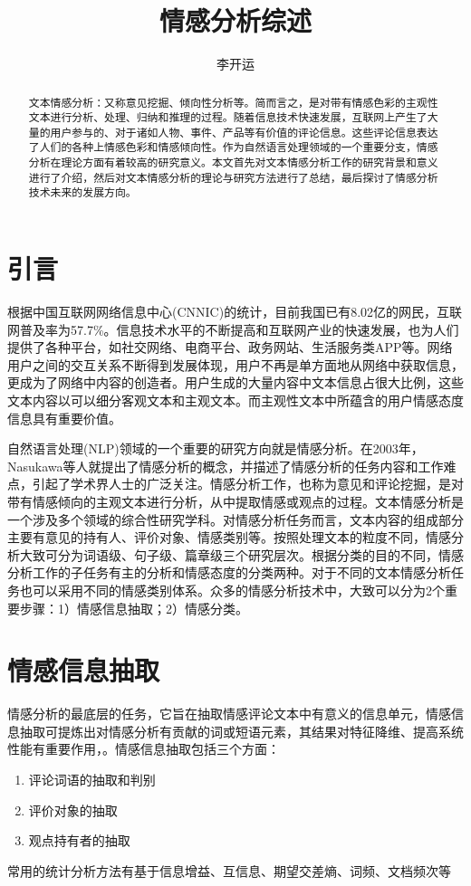 \documentclass{clv3}
\begin{document}
\title{情感分析综述} %

\author{李开运} %


\maketitle

\begin{abstract} %
文本情感分析：又称意见挖掘、倾向性分析等。简而言之，是对带有情感色彩的主观性文本进行分析、处理、归纳和推理的过程。随着信息技术快速发展，互联网上产生了大量的用户参与的、对于诸如人物、事件、产品等有价值的评论信息。这些评论信息表达了人们的各种上情感色彩和情感倾向性。作为自然语言处理领域的一个重要分支，情感分析在理论方面有着较高的研究意义。本文首先对文本情感分析工作的研究背景和意义进行了介绍，然后对文本情感分析的理论与研究方法进行了总结，最后探讨了情感分析技术未来的发展方向。
\end{abstract}

\section{引言} 
根据中国互联网网络信息中心(CNNIC)的统计，目前我国已有8.02亿的网民，互联网普及率为57.7\%。信息技术水平的不断提高和互联网产业的快速发展，也为人们提供了各种平台，如社交网络、电商平台、政务网站、生活服务类APP等。网络用户之间的交互关系不断得到发展体现，用户不再是单方面地从网络中获取信息，更成为了网络中内容的创造者。用户生成的大量内容中文本信息占很大比例，这些文本内容以可以细分客观文本和主观文本。而主观性文本中所蕴含的用户情感态度信息具有重要价值。

自然语言处理(NLP)领域的一个重要的研究方向就是情感分析。在2003年，Nasukawa\cite{sentiment}等人就提出了情感分析的概念，并描述了情感分析的任务内容和工作难点，引起了学术界人士的广泛关注。情感分析工作，也称为意见和评论挖掘，是对带有情感倾向的主观文本进行分析，从中提取情感或观点的过程。文本情感分析是一个涉及多个领域的综合性研究学科。对情感分析任务而言，文本内容的组成部分主要有意见的持有人、评价对象、情感类别等。按照处理文本的粒度不同，情感分析大致可分为词语级、句子级、篇章级三个研究层次。根据分类的目的不同，情感分析工作的子任务有主的分析和情感态度的分类两种。对于不同的文本情感分析任务也可以采用不同的情感类别体系。众多的情感分析技术中，大致可以分为2个重要步骤：1）情感信息抽取；2）情感分类。
\section{情感信息抽取}
情感分析的最底层的任务，它旨在抽取情感评论文本中有意义的信息单元，情感信息抽取可提炼出对情感分析有贡献的词或短语元素，其结果对特征降维、提高系统性能有重要作用，。情感信息抽取包括三个方面：
\begin{enumerate}[(1)]
	\item 评论词语的抽取和判别
	\item 评价对象的抽取
	\item 观点持有者的抽取
\end{enumerate}
常用的统计分析方法有基于信息增益、互信息、期望交差熵、词频、文档频次等
\end{document}
